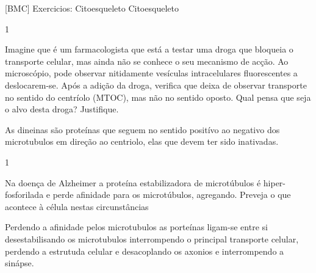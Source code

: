 \documentclass[\mainfilename]{subfiles}
\begin{document}
[BMC]
{Exercicios: Citoesqueleto} %
{Citoesqueleto} %

\begin{questionBox}1{} %

    Imagine que é um farmacologista que está a testar uma droga que bloqueia o transporte celular, mas ainda não se conhece o seu mecanismo de acção. Ao microscópio, pode observar nitidamente vesículas intracelulares fluorescentes a deslocarem-se. Após a adição da droga, verifica que deixa de observar transporte no sentido do centríolo (MTOC), mas não no sentido oposto. Qual pensa que seja o alvo desta droga? Justifique.

    \begin{answerBox}{} %
        As dineinas são proteínas que seguem no sentido positívo ao negativo dos microtubulos em direção ao centriolo, elas que devem ter sido inativadas.
    \end{answerBox}

\end{questionBox}

\begin{questionBox}1{} %
    
    Na doença de Alzheimer a proteína estabilizadora de microtúbulos \chemtau{} é hiper- fosforilada e perde afinidade para os microtúbulos, agregando. Preveja o que acontece à célula nestas circunstâncias

    \begin{answerBox}{} %
        
        Perdendo a afinidade pelos microtubulos as porteínas \chemtau{} ligam-se entre si desestabilisando os microtubulos interrompendo o principal transporte celular, perdendo a estrutuda celular e desacoplando os axonios e interrompendo a sinápse.

    \end{answerBox}

\end{questionBox}
\end{document}
